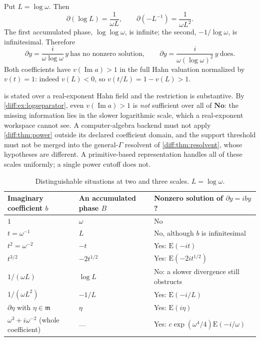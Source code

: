 \documentclass[11pt,letterpaper]{article}
\numberwithin{equation}{section}
\theoremstyle{definition}
\theoremstyle{remark}
\newcommand{\No}{\mathbf{No}}
\newcommand{\der}{\partial}
\newcommand{\mm}{\mathfrak m}
\newcommand{\Imm}{\operatorname{Im}}
\newcommand{\Emm}{\mathrm{E}}
\begin{document}
\begin{example}
\label{diff:ex:logseparator}
Put $L=\log\omega$. Then
\[
 \der(\log L)=\frac{1}{\omega L},
 \qquad
 \der\!\left(-L^{-1}\right)=\frac{1}{\omega L^{2}} .
\]
The first accumulated phase, $\log\log\omega$, is infinite; the second,
$-1/\log\omega$, is infinitesimal. Therefore
\begin{equation}\label{diff:eq:logsep}
 \der y=\frac{i}{\omega\log\omega}\,y
 \ \text{has no nonzero solution},
 \qquad
 \der y=\frac{i}{\omega(\log\omega)^{2}}\,y
 \ \text{does}.
\end{equation}
Both coefficients have $v(\Imm a)>1$ in the full Hahn valuation normalized by
$v(t)=1$: indeed $v(L)<0$, so $v(t/L)=1-v(L)>1$.
\end{example}

\begin{warning}
\label{diff:warn:noglobalization}
 is stated over a real-exponent Hahn field and the
restriction is substantive. By \cref{diff:ex:logseparator}, even
$v(\Imm a)>1$ is \emph{not} sufficient over all of $\No$: the missing
information lies in the slower logarithmic scale, which a real-exponent
workspace cannot see. A computer-algebra backend must not apply
\cref{diff:thm:power} outside its declared coefficient domain, and the
support threshold must not be merged into the general-$\Gamma$ resolvent of
\cref{diff:thm:resolvent}, whose hypotheses are different. A primitive-based
representation handles all of these scales uniformly; a single power cutoff
does not.
\end{warning}

\begin{table}[htbp]
\centering\small
\caption{Distinguishable situations at two and three scales. $L=\log\omega$.}
\label{diff:tab:scales}
\begin{tabularx}{\textwidth}{@{}L{0.22\textwidth}L{0.22\textwidth}Y@{}}
\toprule
Imaginary coefficient $b$ & An accumulated phase $B$ &
Nonzero solution of $\der y=iby$? \\
\midrule
$1$ & $\omega$ & No \\
$t=\omega^{-1}$ & $L$ & No, although $b$ is infinitesimal \\
$t^{2}=\omega^{-2}$ & $-t$ & Yes: $\Emm(-it)$ \\
$t^{3/2}$ & $-2t^{1/2}$ & Yes: $\Emm(-2it^{1/2})$ \\
$1/(\omega L)$ & $\log L$ & No: a slower divergence still obstructs \\
$1/(\omega L^{2})$ & $-1/L$ & Yes: $\Emm(-i/L)$ \\
$\der\eta$ with $\eta\in\mm$ & $\eta$ & Yes: $\Emm(i\eta)$ \\
$\omega^{3}+i\omega^{-2}$ (whole coefficient) & --- &
Yes: $c\exp(\omega^{4}/4)\Emm(-i/\omega)$ \\
\bottomrule
\end{tabularx}
\end{table}
\end{document}
